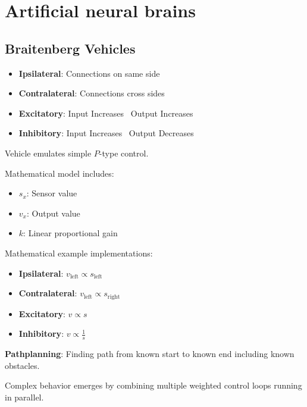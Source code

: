 \documentclass[
    fontsize      = 11pt,
    paper         = a4,
    twoside       = false,
    parskip       = half,
    pagesize      = false,
]{scrartcl}
\author{Robin Prillwitz}
\date{10. August 2022}
\providecommand{\tightlist}{%
  \setlength{\itemsep}{0pt}\setlength{\parskip}{0pt}}
\begin{document}
\hypertarget{artificial-neural-brains}{%
\section{Artificial neural brains}\label{artificial-neural-brains}}

\hypertarget{braitenberg-vehicles}{%
\subsection{Braitenberg Vehicles}\label{braitenberg-vehicles}}

\begin{itemize}
\tightlist
\item
  \textbf{Ipsilateral}: Connections on same side
\item
  \textbf{Contralateral}: Connections cross sides
\item
  \textbf{Excitatory}: Input Increases \textrightarrow~Output Increases
\item
  \textbf{Inhibitory}: Input Increases \textrightarrow~Output Decreases
\end{itemize}

Vehicle emulates simple \(P\)-type control.

Mathematical model includes:

\begin{itemize}
\tightlist
\item
  \(s_x\): Sensor value
\item
  \(v_x\): Output value
\item
  \(k\): Linear proportional gain
\end{itemize}

Mathematical example implementations:

\begin{itemize}
\tightlist
\item
  \textbf{Ipsilateral}: \(v_{\text{left}} \propto s_{\text{left}}\)
\item
  \textbf{Contralateral}: \(v_{\text{left}} \propto s_{\text{right}}\)
\item
  \textbf{Excitatory}: \(v \propto s\)
\item
  \textbf{Inhibitory}: \(v \propto \frac{1}{s}\)
\end{itemize}

\textbf{Pathplanning}: Finding path from known start to known end
including known obstacles.

Complex behavior emerges by combining multiple weighted control loops
running in parallel.
\end{document}
